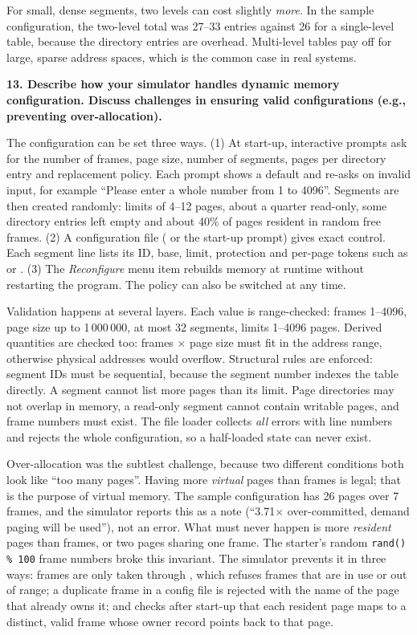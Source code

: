 \documentclass[11pt]{article}
\newcommand{\code}[1]{\texttt{\detokenize{#1}}}
\newcommand{\question}[1]{\par\medskip\noindent\textbf{#1}\par\smallskip}
\begin{document}
For small, dense segments, two levels can cost slightly \emph{more}. In the sample configuration, the
two-level total was 27--33 entries against 26 for a single-level table, because the directory entries are overhead. Multi-level
tables pay off for large, sparse address spaces, which is the common case in real systems.

\question{13. Describe how your simulator handles dynamic memory configuration. Discuss challenges in ensuring valid configurations (e.g., preventing over-allocation).}
The configuration can be set three ways. (1) At start-up, interactive prompts ask for the number of
frames, page size, number of segments, pages per directory entry and replacement policy. Each
prompt shows a default and re-asks on invalid input, for example ``Please enter a whole number from 1 to 4096''.
Segments are then created randomly: limits of 4--12 pages, about a quarter read-only, some directory
entries left empty and about 40\% of pages resident in random free frames. (2) A configuration file
(\code{--config} or the start-up prompt) gives exact control. Each segment line lists its ID, base,
limit, protection and per-page tokens such as \code{6:RW} or \code{-:RO}. (3) The \emph{Reconfigure}
menu item rebuilds memory at runtime without restarting the program. The policy can also be switched at
any time.

Validation happens at several layers. Each value is range-checked: frames 1--4096, page size up to 1\,000\,000, at most
32 segments, limits 1--4096 pages. Derived quantities are checked too: frames $\times$ page size must fit in
the address range, otherwise physical addresses would overflow. Structural rules are enforced:
segment IDs must be sequential, because the segment number indexes the table directly. A segment
cannot list more pages than its limit. Page directories may not overlap in memory, a read-only segment
cannot contain writable pages, and frame numbers must exist. The file loader collects \emph{all}
errors with line numbers and rejects the whole configuration, so a half-loaded state can never exist.

Over-allocation was the subtlest challenge, because two different conditions both look like ``too many pages''.
Having more \emph{virtual} pages than frames is legal; that is the purpose of virtual memory. The
sample configuration has 26 pages over 7 frames, and the simulator reports this as a note (``3.71$\times$
over-committed, demand paging will be used''), not an error. What must never happen is more
\emph{resident} pages than frames, or two pages sharing one frame. The starter's random
\texttt{rand() \% 100} frame numbers broke this invariant. The simulator prevents it in three ways: frames are only taken
through \code{claimFrame}, which refuses frames that are in use or out of range; a duplicate frame in a config file is
rejected with the name of the page that already owns it; and \code{validateConfiguration()} checks after start-up that
each resident page maps to a distinct, valid frame whose owner record points back to that page.
\end{document}
